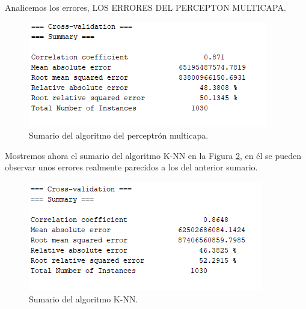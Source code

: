 \documentclass[a4paper, 11pt, twoside, openany, onecolumn, final]{memoir}
\begin{document}
	Analicemos los errores, LOS ERRORES DEL PERCEPTON MULTICAPA.
	\begin{figure}
  		\centering
   	\includegraphics{Imagenes/SumarioPerceptron}
  		\caption{Sumario del algoritmo del perceptrón multicapa.}
  		\label{SumarioPerceptron}
	\end{figure}
	Mostremos ahora el sumario del algoritmo K-NN en la Figura \ref{SumarioKNN}, en él se pueden observar unos errores realmente parecidos a los del anterior sumario.	 
	\begin{figure}
  		\centering
   	\includegraphics{Imagenes/SumarioKNN}
  		\caption{Sumario del algoritmo K-NN.}
  		\label{SumarioKNN}
	\end{figure}	 
	 
\end{document}
